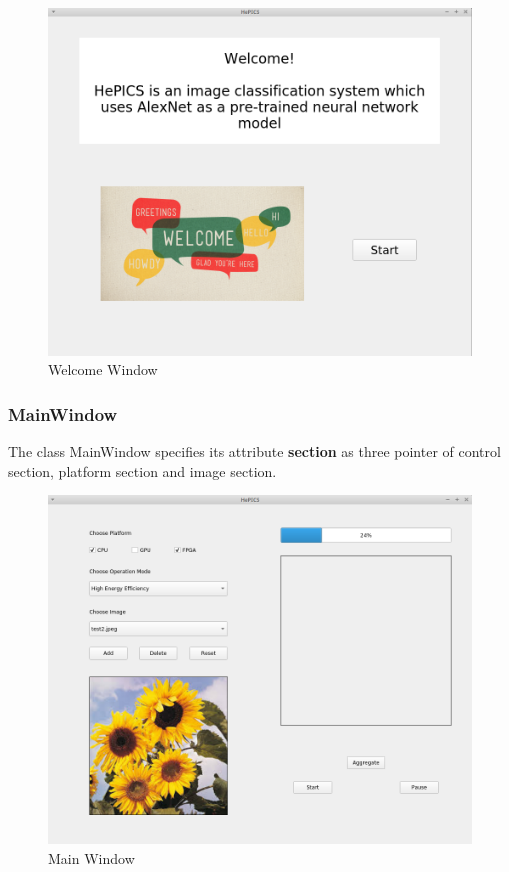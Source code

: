 \documentclass[parskip=full]{scrartcl}
\newcommand\tab[1][1cm]{\hspace*{#1}}
\begin{document}
        \begin{figure}[H]
	        \centering
	        \includegraphics[scale=0.55]{images/welcomewindow.PNG}
	        \caption{Welcome Window}
	        \label{fig:my_label}
	    \end{figure}
        
    \pagebreak
    
    \subsubsection{MainWindow}
        \tab The class MainWindow specifies its attribute \textbf{section} as three pointer of control section, platform section and image section.
        
         \begin{figure}[H]
	        \centering
	        \includegraphics[scale=0.7]{images/main_window.PNG}
	        \caption{Main Window}
	        \label{fig:my_label}
	    \end{figure}       
        
\end{document}

